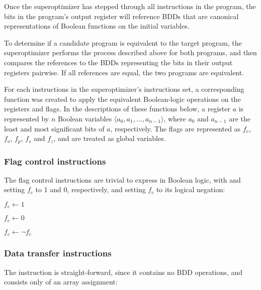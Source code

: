 \documentclass[a4paper,11pt]{kth-mag}
\renewcommand{\gets}{\leftarrow}
\newcommand{\NOT}{\lnot}
\begin{document}
Once the superoptimizer has stepped through all instructions in the program, the bits in the program's output register will reference BDDs that are canonical representations of Boolean functions on the initial variables.

To determine if a candidate program is equivalent to the target program, the superoptimizer performs the process described above for both programs, and then compares the references to the BDDs representing the bits in their output registers pairwise.
If all references are equal, the two programs are equivalent.

For each instructions in the superoptimizer's instructions set, a corresponding function was created to apply the equivalent Boolean-logic operations on the registers and flags.
In the descriptions of these functions below, a register $a$ is represented by $n$ Boolean variables $\langle a_0, a_1, ..., a_{n-1} \rangle$, where $a_0$ and $a_{n-1}$ are the least and most significant bits of $a$, respectively.
The flags are represented as $f_c$, $f_o$, $f_p$, $f_s$ and $f_z$, and are treated as global variables.

\subsubsection{Flag control instructions}

The flag control instructions are trivial to express in Boolean logic, with  and  setting $f_c$ to 1 and 0, respectively, and  setting $f_c$ to its logical negation:

\begin{codebox}
\zi $f_c \gets 1$
\end{codebox}

\begin{codebox}
\zi $f_c \gets 0$
\end{codebox}

\begin{codebox}
\zi $f_c \gets \NOT f_c$
\end{codebox}

\subsubsection{Data transfer instructions}

The  instruction is straight-forward, since it contains no BDD operations, and consists only of an array assignment:
\end{document}
